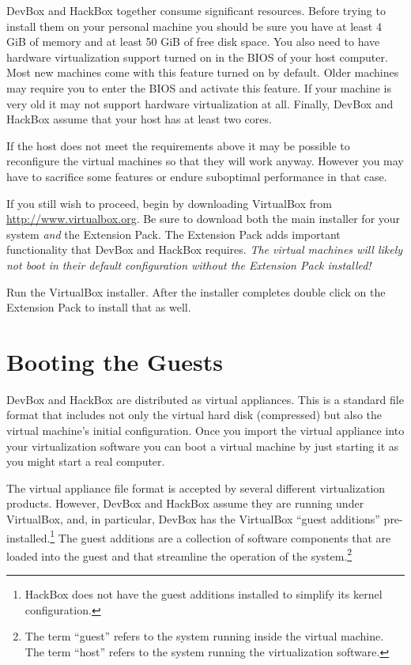 \documentclass[twocolumn]{article}
\begin{document}
DevBox and HackBox together consume significant resources. Before trying to install them on your
personal machine you should be sure you have at least 4 GiB of memory and at least 50 GiB of
free disk space. You also need to have hardware virtualization support turned on in the BIOS of
your host computer. Most new machines come with this feature turned on by default. Older
machines may require you to enter the BIOS and activate this feature. If your machine is very
old it may not support hardware virtualization at all. Finally, DevBox and HackBox assume that
your host has at least two cores.

If the host does not meet the requirements above it may be possible to reconfigure the virtual
machines so that they will work anyway. However you may have to sacrifice some features or
endure suboptimal performance in that case.

If you still wish to proceed, begin by downloading VirtualBox from
\url{http://www.virtualbox.org}. Be sure to download both the main installer for your system
\emph{and} the Extension Pack. The Extension Pack adds important functionality that DevBox and
HackBox requires. \emph{The virtual machines will likely not boot in their default configuration
  without the Extension Pack installed!}

Run the VirtualBox installer. After the installer completes double click on the Extension Pack
to install that as well.

\section{Booting the Guests}
\label{sec:booting-guests}

DevBox and HackBox are distributed as virtual appliances. This is a standard file format that
includes not only the virtual hard disk (compressed) but also the virtual machine's initial
configuration. Once you import the virtual appliance into your virtualization software you can
boot a virtual machine by just starting it as you might start a real computer. 

The virtual appliance file format is accepted by several different virtualization products.
However, DevBox and HackBox assume they are running under VirtualBox, and, in particular, DevBox
has the VirtualBox ``guest additions'' pre-installed.\footnote{HackBox does not have the guest
  additions installed to simplify its kernel configuration.} The guest additions are a
collection of software components that are loaded into the guest and that streamline the
operation of the system.\footnote{The term ``guest'' refers to the system running inside the
  virtual machine. The term ``host'' refers to the system running the virtualization software.}
\end{document}
